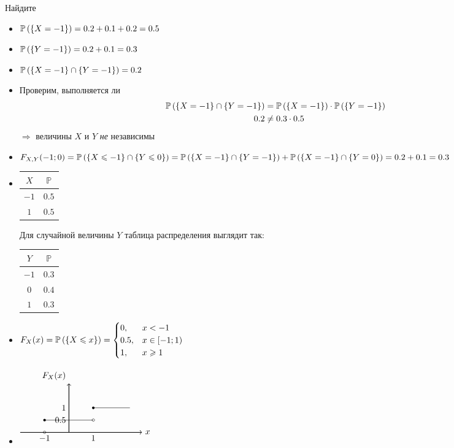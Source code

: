 \documentclass{article}
\begin{document}
Найдите
\begin{itemize}
    \item $\mathbb{P}\left(\{X=-1\}\right)=0.2+0.1+0.2=0.5$
    \item $\mathbb{P}\left(\{Y=-1\}\right)=0.2+0.1=0.3$
    \item $\mathbb{P}\left(\{X=-1\}\cap\{Y=-1\}\right)=0.2$ %
    \item Проверим, выполняется ли 
    \begin{equation*}
        \begin{aligned}
            \mathbb{P}\left(\{X=-1\}\cap\{Y=-1\}\right)&=\mathbb{P}\left(\{X=-1\}\right)\cdot\mathbb{P}\left(\{Y=-1\}\right)\\
            0.2&\ne0.3\cdot0.5
        \end{aligned}
    \end{equation*}
    $\Longrightarrow $ величины $X$ и $Y$ \textit{не} независимы
    \item $F_{X,Y}(-1;0)=\mathbb{P}\left(\{X\leqslant-1\}\cap\{Y\leqslant0\}\right)=\mathbb{P}\left(\{X=-1\}\cap\{Y=-1\}\right)+\mathbb{P}\left(\{X=-1\}\cap\{Y=0\}\right)=0.2+0.1=0.3$
    \item \begin{tabular}{c|c}
        $X$&$\mathbb{P}$\\
        \hline
        $-1$&$0.5$\\
        \hline
        $1$&$0.5$
    \end{tabular}

    \comment Для случайной величины $Y$ таблица распределения выглядит так: \begin{tabular}{c|c}
        $Y$&$\mathbb{P}$\\
        \hline
        $-1$&$0.3$\\
        \hline
        $0$&$0.4$\\
        \hline
        $1$&$0.3$
    \end{tabular}
    \item $F_{X}(x)=\mathbb{P}\left(\{X\leqslant x\}\right)=\begin{cases}
        0,&x<-1\\
        0.5,&x\in[-1;1)\\
        1,&x\geqslant 1
    \end{cases}$
    \item $\begin{tikzpicture}
        \draw[black, ->, thick] (-2,0) -- (3,0) node [right] {$x$};
        \draw[black, ->, thick] (0,0) -- (0,2) node [above left] {$F_X(x)$};
        \draw[black, thin] (-1,0.5) -- (1,0.5);
        \fill[black] (-1,0.5) circle (1.5pt);
        \draw[black, thin] (1,1) -- (2.5,1);
        \fill[black] (1,1) circle (1.5pt);
        \draw (1,0.5) circle (1.5pt);
        \draw (-1,0) node [black, below] {$-1$} circle (1.5pt);
        \draw[black] (1,0) node [black, below] {$1$};
        \draw[black] (0,0.5) node [black, left] {$0.5$};
        \draw[black] (0,1) node [black, left] {$1$};
    \end{tikzpicture}$
\end{itemize}
\end{document}
